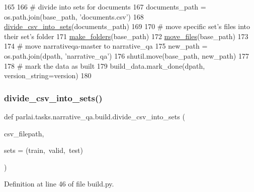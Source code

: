 \begin{DoxyCode}
165 
166         \textcolor{comment}{# divide into sets for documents}
167         documents\_path = os.path.join(base\_path, \textcolor{stringliteral}{'documents.csv'})
168         \hyperlink{namespaceparlai_1_1tasks_1_1narrative__qa_1_1build_a104cbf949215e7b505c73b33017b1970}{divide\_csv\_into\_sets}(documents\_path)
169 
170         \textcolor{comment}{# move specific set's files into their set's folder}
171         \hyperlink{namespaceparlai_1_1tasks_1_1narrative__qa_1_1build_a602f90b82e6c6eafbd13647ba7567101}{make\_folders}(base\_path)
172         \hyperlink{namespaceparlai_1_1tasks_1_1narrative__qa_1_1build_a53e5ef8d085ebdfc1cc6c4918841d097}{move\_files}(base\_path)
173 
174         \textcolor{comment}{# move narrativeqa-master to narrative\_qa}
175         new\_path = os.path.join(dpath, \textcolor{stringliteral}{'narrative\_qa'})
176         shutil.move(base\_path, new\_path)
177 
178         \textcolor{comment}{# mark the data as built}
179         build\_data.mark\_done(dpath, version\_string=version)
180 \end{DoxyCode}
\mbox{\label{namespaceparlai_1_1tasks_1_1narrative__qa_1_1build_a104cbf949215e7b505c73b33017b1970}} 
\subsubsection{\texorpdfstring{divide\+\_\+csv\+\_\+into\+\_\+sets()}{divide\_csv\_into\_sets()}}
{\footnotesize\ttfamily def parlai.\+tasks.\+narrative\+\_\+qa.\+build.\+divide\+\_\+csv\+\_\+into\+\_\+sets (\begin{DoxyParamCaption}\item[{}]{csv\+\_\+filepath,  }\item[{}]{sets = {\ttfamily (\textquotesingle{}train\textquotesingle{},~\textquotesingle{}valid\textquotesingle{},~\textquotesingle{}test\textquotesingle{})} }\end{DoxyParamCaption})}



Definition at line 46 of file build.\+py.


